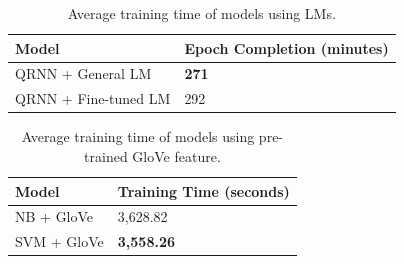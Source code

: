 \documentclass[a4paper,twoside,phd]{BYUPhys}
\begin{document}
\begin{table}[H]
	\centering
	\caption{Average training time of models using LMs.}	
	\begin{tabular}{|p{4.2cm}|p{5cm}|}
		\hline
		
		\textbf{Model} & \textbf{Epoch Completion \newline (minutes)}                                                                                                                                                                                                                                                                                                                                                    \\
		\hline                                                                                                                                              
		
		QRNN + General LM  & \textbf{271}  \\
		\hline
		
		QRNN + \newline Fine-tuned LM  & 292  \\
		\hline
		
		
	\end{tabular}
	\label{table:QRNNTrainingTime}
\end{table}

\begin{table}[H]
	\centering
	\caption{Average training time of models using pre-trained GloVe feature.}	
	\begin{tabular}{|p{4.2cm}|p{5cm}|}
		\hline
		
		\textbf{Model} & \textbf{Training Time (seconds)}                                                                                                                                                                                                                                                                                                                                                    \\
		\hline                                                                                                                                           
		
		NB + GloVe & 3,628.82 \\
		\hline     
		
		SVM + GloVe & \textbf{3,558.26} \\
		\hline                                                                                                                                        
		
	\end{tabular}
	\label{table:PreTrainedTrainingTime}
\end{table}
\end{document}
